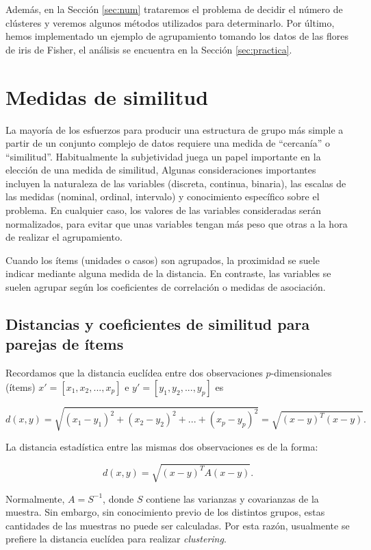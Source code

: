 \documentclass[a4paper, 20pt]{article}
\begin{document}
Además, en la Sección \ref{sec:num} trataremos el problema de decidir el número de clústeres y veremos algunos métodos utilizados para determinarlo. Por último, hemos implementado un ejemplo de agrupamiento tomando los datos de las flores de iris de Fisher, el análisis se encuentra en la Sección \ref{sec:practica}.

\section{Medidas de similitud}\label{sec:medidas}

La mayoría de los esfuerzos para producir una estructura de grupo más simple a partir de un conjunto complejo de datos requiere una medida de ``cercanía'' o  ``similitud''. Habitualmente la subjetividad juega un papel importante en la elección de una medida de similitud, Algunas consideraciones importantes incluyen la naturaleza de las variables (discreta, continua, binaria), las escalas de las medidas (nominal, ordinal, intervalo) y conocimiento específico sobre el problema. En cualquier caso, los valores de las variables consideradas serán normalizados, para evitar que unas variables tengan más peso que otras a la hora de realizar el agrupamiento.

Cuando los ítems (unidades o casos) son agrupados, la proximidad se suele indicar mediante alguna medida de la distancia. En contraste, las variables se suelen agrupar según los coeficientes de correlación o medidas de asociación.

\subsection{Distancias y coeficientes de similitud para parejas de ítems}

Recordamos que la distancia euclídea entre dos observaciones $p$-dimensionales (ítems) $x' = [x_1,x_2,...,x_p]$ e $y'=[y_1,y_2,...,y_p]$ es

\[d(x,y) = \sqrt{(x_1-y_1)^2+(x_2-y_2)^2+...+(x_p-y_p)^2}=\sqrt{(x-y)^T(x-y)}.\]

La distancia estadística entre las mismas dos observaciones es de la forma:

$$d(x,y)=\sqrt{(x-y)^TA(x-y)}. $$

Normalmente, $A=S^{-1}$, donde $S$ contiene las varianzas y covarianzas de la muestra. Sin embargo, sin conocimiento previo de los distintos grupos, estas cantidades de las muestras no puede ser calculadas. Por esta razón, usualmente se prefiere la distancia euclídea para realizar \textit{clustering}.\\
\end{document}

